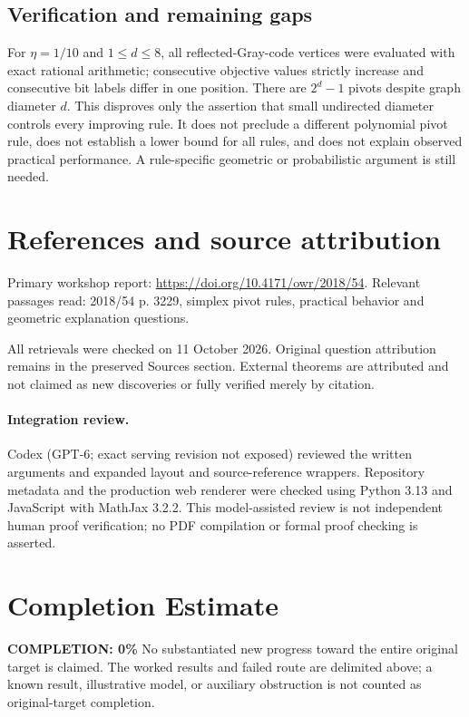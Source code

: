 \documentclass[11pt]{article}
\begin{document}
\subsection{Verification and remaining gaps}
For $\eta=1/10$ and $1\le d\le8$, all reflected-Gray-code vertices were evaluated with exact rational arithmetic; consecutive objective values strictly increase and consecutive bit labels differ in one position. There are $2^d-1$ pivots despite graph diameter $d$. This disproves only the assertion that small undirected diameter controls every improving rule. It does not preclude a different polynomial pivot rule, does not establish a lower bound for all rules, and does not explain observed practical performance. A rule-specific geometric or probabilistic argument is still needed.

\section{References and source attribution}
Primary workshop report: \url{https://doi.org/10.4171/owr/2018/54}. Relevant passages read: 2018/54 p. 3229, simplex pivot rules, practical behavior and geometric explanation questions.

All retrievals were checked on 11 October 2026. Original question attribution remains in the preserved Sources section. External theorems are attributed and not claimed as new discoveries or fully verified merely by citation.


\paragraph{Integration review.} Codex (GPT-6; exact serving revision not exposed) reviewed the written arguments and expanded layout and source-reference wrappers. Repository metadata and the production web renderer were checked using Python 3.13 and JavaScript with MathJax 3.2.2. This model-assisted review is not independent human proof verification; no PDF compilation or formal proof checking is asserted.

\section{Completion Estimate}
\noindent\textbf{COMPLETION: 0\%}
No substantiated new progress toward the entire original target is claimed. The worked results and failed route are delimited above; a known result, illustrative model, or auxiliary obstruction is not counted as original-target completion.
\end{document}
